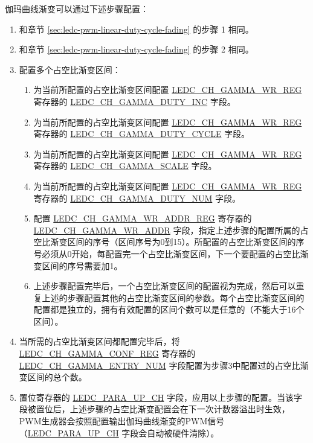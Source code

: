 \documentclass[main\_\_CN.tex]{subfiles}
\begin{document}
伽玛曲线渐变可以通过下述步骤配置：
\begin{enumerate}
    \item 和章节 \ref{sec:ledc-pwm-linear-duty-cycle-fading} 的步骤 1 相同。
    \item 和章节 \ref{sec:ledc-pwm-linear-duty-cycle-fading} 的步骤 2 相同。
    \item 配置多个占空比渐变区间：
    \begin{enumerate}
        \item 为当前所配置的占空比渐变区间配置 \hyperref[regdesc:LEDCCHNGAMMAWRREG]{LEDC\_CH\_GAMMA\_WR\_REG} 寄存器的 \hyperref[fielddesc:LEDCCHNGAMMADUTYINC]{LEDC\_CH\_GAMMA\_DUTY\_INC} 字段。
        \item 为当前所配置的占空比渐变区间配置 \hyperref[regdesc:LEDCCHNGAMMAWRREG]{LEDC\_CH\_GAMMA\_WR\_REG} 寄存器的 \hyperref[fielddesc:LEDCCHNGAMMADUTYCYCLE]{LEDC\_CH\_GAMMA\_DUTY\_CYCLE} 字段。
        \item 为当前所配置的占空比渐变区间配置 \hyperref[regdesc:LEDCCHNGAMMAWRREG]{LEDC\_CH\_GAMMA\_WR\_REG} 寄存器的 \hyperref[fielddesc:LEDCCHNGAMMASCALE]{LEDC\_CH\_GAMMA\_SCALE} 字段。
        \item 为当前所配置的占空比渐变区间配置 \hyperref[regdesc:LEDCCHNGAMMAWRREG]{LEDC\_CH\_GAMMA\_WR\_REG} 寄存器的 \hyperref[fielddesc:LEDCCHNGAMMADUTYNUM]{LEDC\_CH\_GAMMA\_DUTY\_NUM} 字段。
        \item 配置 \hyperref[regdesc:LEDCCHNGAMMAWRADDRREG]{LEDC\_CH\_GAMMA\_WR\_ADDR\_REG} 寄存器的 \hyperref[fielddesc:LEDCCHNGAMMAWRADDR]{LEDC\_CH\_GAMMA\_WR\_ADDR} 字段，指定上述步骤的配置所属的占空比渐变区间的序号（区间序号为0到15）。所配置的占空比渐变区间的序号必须从0开始，每配置完一个占空比渐变区间，下一个要配置的占空比渐变区间的序号需要加1。
        \item 上述步骤配置完毕后，一个占空比渐变区间的配置视为完成，然后可以重复上述的步骤配置其他的占空比渐变区间的参数。每个占空比渐变区间的配置都是独立的，拥有有效配置的区间个数可以是任意的（不能大于16个区间）。
    \end{enumerate}
    \item 当所需的占空比渐变区间都配置完毕后，将 \hyperref[regdesc:LEDCCHNGAMMACONFREG]{LEDC\_CH\_GAMMA\_CONF\_REG} 寄存器的 \hyperref[fielddesc:LEDCCHNGAMMAENTRYNUM]{LEDC\_CH\_GAMMA\_ENTRY\_NUM} 字段配置为步骤3中配置过的占空比渐变区间的总个数。
    \item 置位寄存器的 \hyperref[fielddesc:LEDCPARAUPCHN]{LEDC\_PARA\_UP\_CH} 字段，应用以上步骤的配置。当该字段被置位后，上述步骤的占空比渐变配置会在下一次计数器溢出时生效，PWM生成器会按照配置输出伽玛曲线渐变的PWM信号（\hyperref[fielddesc:LEDCPARAUPCHN]{LEDC\_PARA\_UP\_CH} 字段会自动被硬件清除）。
\end{enumerate}
\end{document}
